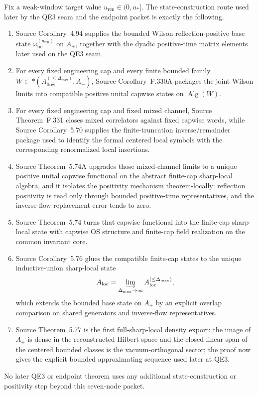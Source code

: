 \documentclass[preprint,aip,jmp,amsmath,amssymb,nofootinbib]{revtex4-2}
\begin{document}
\begin{proposition}\label{prop:LaneA_state_construction_ledger}
Fix a weak-window target value $u_{\mathrm{ren}}\in(0,u_*]$. The state-construction route used later by the QE3 seam and the endpoint packet is exactly the following.
\begin{enumerate}[label=\textup{(\roman*)},leftmargin=2.25em]
\item Source Corollary~4.94 supplies the bounded Wilson reflection-positive base state $\omega_{\mathrm{bd}}^{(u_{\mathrm{ren}})}$ on $A_+$, together with the dyadic positive-time matrix elements later used on the QE3 seam.
\item For every fixed engineering cap and every finite bounded family $W\subset \ast(A_{\mathrm{flow}}^{(\le \Delta_{\max})},A_+)$, Source Corollary~F.330A packages the joint Wilson limits into compatible positive unital capwise states on $\operatorname{Alg}(W)$.
\item For every fixed engineering cap and fixed mixed channel, Source Theorem~F.331 closes mixed correlators against fixed capwise words, while Source Corollary~5.70 supplies the finite-truncation inverse/remainder package used to identify the formal centered local symbols with the corresponding renormalized local insertions.
\item Source Theorem~5.74A upgrades those mixed-channel limits to a unique positive unital capwise functional on the abstract finite-cap sharp-local algebra, and it isolates the positivity mechanism theorem-locally: reflection positivity is read only through bounded positive-time representatives, and the inverse-flow replacement error tends to zero.
\item Source Theorem~5.74 turns that capwise functional into the finite-cap sharp-local state with capwise OS structure and finite-cap field realization on the common invariant core.
\item Source Corollary~5.76 glues the compatible finite-cap states to the unique inductive-union sharp-local state
\[
A_{\mathrm{loc}}=\varinjlim_{\Delta_{\max}\to\infty}A_{\mathrm{loc}}^{(\le \Delta_{\max})},
\]
which extends the bounded base state on $A_+$ by an explicit overlap comparison on shared generators and inverse-flow representatives.
\item Source Theorem~5.77 is the first full-sharp-local density export: the image of $A_+$ is dense in the reconstructed Hilbert space and the closed linear span of the centered bounded classes is the vacuum-orthogonal sector; the proof now gives the explicit bounded approximating sequence used later at QE3.
\end{enumerate}
No later QE3 or endpoint theorem uses any additional state-construction or positivity step beyond this seven-node packet.
\end{proposition}
\end{document}
